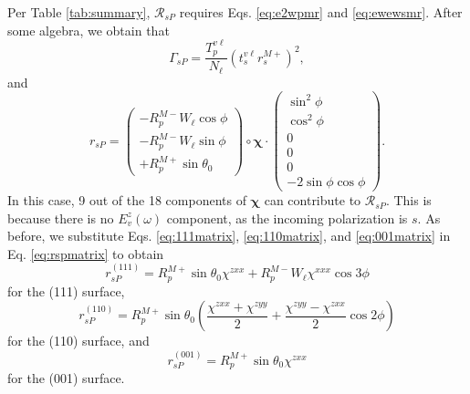 \documentclass[aps,prb,10pt,showpacs,letterpaper,twocolumn]{revtex4-1}
\begin{document}
Per Table \ref{tab:summary}, $\mathcal{R}_{sP}$ requires Eqs. \eqref{eq:e2wpmr}
and \eqref{eq:ewewsmr}. After some algebra, we obtain that
\begin{equation}\label{mcv4}
\Gamma_{sP}=
\frac{T^{v\ell}_{p}}{N_{\ell}}
\left(t^{v\ell}_{s}r^{M+}_{s}\right)^{2},
\end{equation}
and
{\color{red}
\begin{equation}\label{eq:rspmatrix}
r_{sP} =
\begin{pmatrix}
-R^{M-}_{p}W_{\ell}\cos\phi \\[3pt]
-R^{M-}_{p}W_{\ell}\sin\phi \\[3pt]
+R^{M+}_{p}\sin\theta_{0}
\end{pmatrix}
\circ
\boldsymbol{\chi}
\cdot
\begin{pmatrix}
\sin^{2}\phi\\
\cos^{2}\phi\\
0\\
0\\
0\\
- 2\sin\phi\cos\phi
\end{pmatrix}
.
\end{equation}
In this case, 9 out of the 18 components of $\boldsymbol{\chi}$ can contribute
to $\mathcal{R}_{sP}$. This is because there is no $E^z_v(\omega)$ component,
as the incoming polarization is $s$. As before, we substitute Eqs.
\eqref{eq:111matrix}, \eqref{eq:110matrix}, and \eqref{eq:001matrix} in Eq.
\eqref{eq:rspmatrix} to obtain
}
\begin{equation}\label{eq:rsp111}
r^{(111)}_{sP} = 
R^{M+}_{p}\sin\theta_{0}\chi^{zxx} +
R^{M-}_{p}W_{\ell}\chi^{xxx}\cos3\phi
\end{equation}
for the (111) surface,
\begin{equation}\label{eq:rsp110}
r^{(110)}_{sP} = 
R^{M+}_{p}\sin\theta_{0}
\left(
\frac{\chi^{zxx} + \chi^{zyy}}{2} + \frac{\chi^{zyy} - \chi^{zxx}}{2}\cos2\phi
\right)
\end{equation}
for the (110) surface, and
\begin{equation}\label{eq:rsp001}
r^{(001)}_{sP} = R^{M+}_{p}\sin\theta_{0}\chi^{zxx}
\end{equation}
for the (001) surface.
\end{document}
